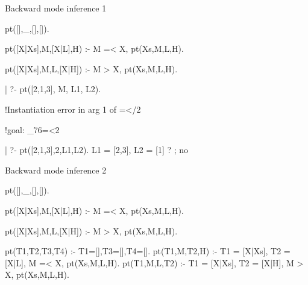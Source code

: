 \documentclass{beamer}
\begin{document}
\begin{frame}[fragile]{Backward mode inference 1}

\vspace{\fill}

\begin{minipage}[t]{.45\textwidth}
\begin{semiverbatim}
pt([],_,[],[]).

pt([X|Xs],M,[X|L],H) :-
     M =< X,
     pt(Xs,M,L,H).

pt([X|Xs],M,L,[X|H]) :-
     M > X,
     pt(Xs,M,L,H).
\end{semiverbatim}
\end{minipage}
\hspace{\fill}
\begin{minipage}[t]{.50\textwidth}
\begin{semiverbatim} \footnotesize
| ?- pt([2,1,3], M, L1, L2).

!Instantiation error in arg 1 of =</2

!goal:  _76=<2

| ?- pt([2,1,3],2,L1,L2).
L1 = [2,3], L2 = [1] ? ;
no
\end{semiverbatim}
\end{minipage}

\vspace{\fill}
\end{frame}

\begin{frame}[fragile]{Backward mode inference 2}
\vspace{\fill}

\begin{minipage}[t]{.45\textwidth}
\begin{semiverbatim}
pt([],_,[],[]).

pt([X|Xs],M,[X|L],H) :-
     M =< X,
     pt(Xs,M,L,H).

pt([X|Xs],M,L,[X|H]) :-
     M > X,
     pt(Xs,M,L,H).
\end{semiverbatim}
\end{minipage} \hspace{\fill}
\begin{minipage}[t]{.45\textwidth}
\begin{semiverbatim}
pt(T1,T2,T3,T4) :-
     T1=[],T3=[],T4=[].
pt(T1,M,T2,H) :-
     T1 = [X|Xs],
     T2 = [X|L],
     M =< X,
     pt(Xs,M,L,H).
pt(T1,M,L,T2) :-
     T1 = [X|Xs],
     T2 = [X|H],
     M > X,
     pt(Xs,M,L,H).
\end{semiverbatim}
\end{minipage}
\vspace{\fill}

\end{frame}
\end{document}
